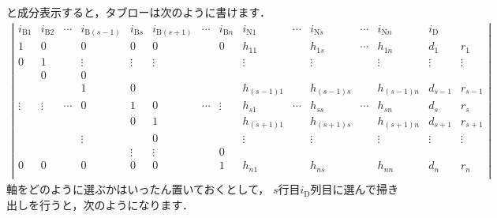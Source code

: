 \documentclass[a4paper]{jsarticle}
\begin{document}
と成分表示すると，タブローは次のように書けます．
\begin{align*}
\left|\begin{array}{c|c|c|c|c|c|c|c|c|c|c|c|c|c|c}
i_{\mathrm{B}1} & i_{\mathrm{B}2} & \cdots & i_{\mathrm{B}(s-1)} & i_{\mathrm{B}s} & i_{\mathrm{B}(s+1)} & \cdots & i_{\mathrm{B}n} & i_{\mathrm{N}1} & \cdots & i_{\mathrm{N}s} & \cdots & i_{\mathrm{N}n} & i_{\mathrm{D}} & \\
\hline
1      & 0      &        & 0      & 0      & 0      &        & 0      & h_{11}    &        & h_{1s}    & \cdots & h_{1n}    & d_{1}   & r_{1} \\
0      & 1      &        & \vdots & \vdots & \vdots &        &        & \vdots   &        & \vdots   &        & \vdots   & \vdots & \vdots \\
       & 0      &        & 0      &        &        &        &        &          &        &          &        &          &        &        \\
       &        &        & 1      & 0      &        &        &        & h_{(s-1)1} &        & h_{(s-1)s} &        & h_{(s-1)n} & d_{s-1}  & r_{s-1} \\
\vdots & \vdots & \cdots & 0      & 1      & 0      & \cdots & \vdots & h_{s1}    & \cdots & h_{ss}    & \cdots & h_{sn}    & d_{s}   & r_{s} \\
       &        &        &        & 0      & 1      &        &        & h_{(s+1)1} &        & h_{(s+1)s} &        & h_{(s+1)n} & d_{s+1}  & r_{s+1} \\
       &        &        & \vdots &        & 0      &        &        & \vdots   &        & \vdots   &        & \vdots   & \vdots & \vdots \\
       &        &        &        & \vdots & \vdots &        & 0      &          &        &          &        &          &        &        \\
0      & 0      &        & 0      & 0      & 0      &        & 1      & h_{n1}    &        & h_{ns}    &        & h_{nn}    & d_{n}   & r_{n} \\
\end{array}\right|
\end{align*}
軸をどのように選ぶかはいったん置いておくとして，
$s$行目$i_{\mathrm{D}}$列目に選んで掃き出しを行うと，次のようになります．
\end{document}
